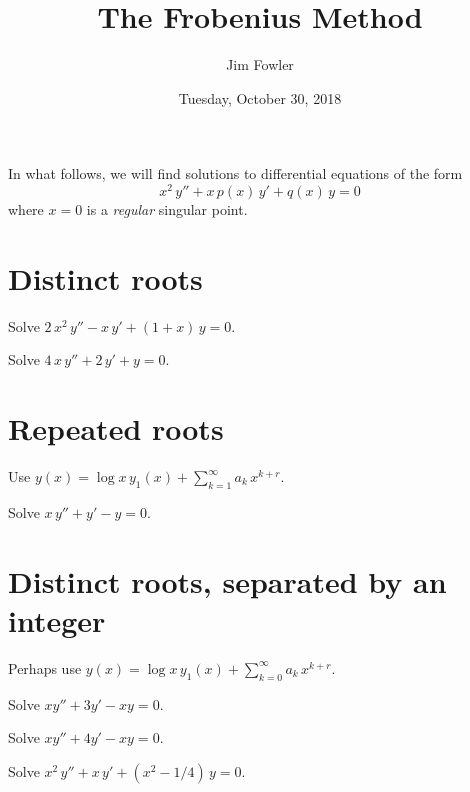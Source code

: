 \documentclass{homework}
\author{Jim Fowler}
\title{The Frobenius Method}
\date{Tuesday, October 30, 2018}
\begin{document}
\maketitle

\newenvironment{truefalse}{\begin{problem}}{\hfill \textsf{True\quad False}\end{problem}}

In what follows, we will find solutions to differential equations of the form
\[
  x^2 \, y'' + x \, p(x) \, y' + q(x) \, y = 0
\]
where $x = 0$ is a \textit{regular} singular point.

\section{Distinct roots}

\begin{problem}
  Solve $2 \, x^2 \, y'' - x\, y' + (1+x) \, y = 0$.
\end{problem}

\vfill


\begin{problem}
  Solve $4\, x\, y'' + 2 \, y' + y = 0$.
\end{problem}

\vfill


\section{Repeated roots}

Use $y(x) = \log x \, y_1(x) + \sum_{k=1}^\infty a_k \, x^{k+r}$.

\begin{problem}
  Solve $x \, y'' + y' - y = 0$.
\end{problem}

\vfill


\section{Distinct roots, separated by an integer}

Perhaps use $y(x) = \log x \, y_1(x) + \sum_{k=0}^\infty a_k \, x^{k+r}$.


\begin{problem}\label{evens}
  Solve $x y'' + 3 y' - xy = 0$.
\end{problem}

\vfill


\begin{problem}\label{odds}
  Solve $x y'' + 4 y' - xy = 0$.
\end{problem}

\vfill





\begin{problem}
  Solve $x^2 \, y'' + x \, y' + \left( x^2 - 1/4 \right) \, y = 0 $.
\end{problem}

\vfill
\end{document}
